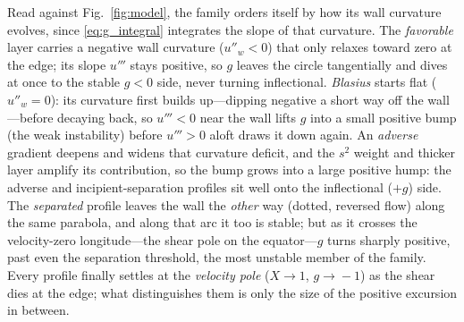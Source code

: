 \documentclass[journal]{new-aiaa}
\begin{document}
Read against Fig.~\ref{fig:model}, the family orders itself by how its wall
curvature evolves, since \eqref{eq:g_integral} integrates the slope of that
curvature. The \emph{favorable} layer carries a negative wall curvature
($u''_w\!<\!0$) that only relaxes toward zero at the edge; its slope $u'''$ stays
positive, so $g$ leaves the circle tangentially and dives at once to the stable
$g\!<\!0$ side, never turning inflectional. \emph{Blasius} starts flat
($u''_w\!=\!0$): its curvature first builds up---dipping negative a short way off
the wall---before decaying back, so $u'''\!<\!0$ near the wall lifts $g$ into a
small positive bump (the weak instability) before $u'''\!>\!0$ aloft draws it
down again. An \emph{adverse} gradient deepens and widens that curvature deficit,
and the $s^2$ weight and thicker layer amplify its contribution, so the bump
grows into a large positive hump: the adverse and incipient-separation profiles
sit well onto the inflectional ($+g$) side. The \emph{separated} profile leaves
the wall the \emph{other} way (dotted, reversed flow) along the same parabola,
and along that arc it too is stable; but as it crosses the velocity-zero
longitude---the shear pole on the equator---$g$ turns sharply positive, past even
the separation threshold, the most unstable member of the family. Every profile
finally settles at the \emph{velocity pole} ($X\!\to\!1$, $g\!\to\!-1$) as the
shear dies at the edge; what distinguishes them is only the size of the positive
excursion in between.
\end{document}
